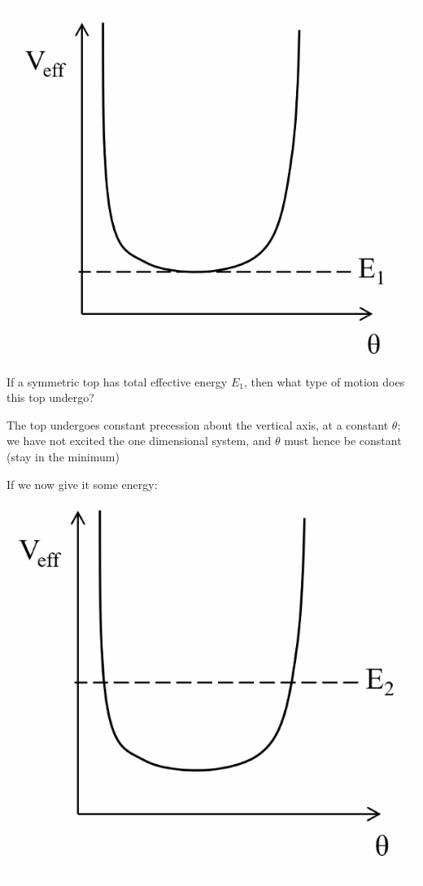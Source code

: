 \begin{center}
    \includegraphics[scale=0.5]{Lecture-22/l22-img2.png}
\end{center}
If a symmetric top has total effective energy $E_1$, then what type of motion does this top undergo?
\begin{s}
The top undergoes constant precession about the vertical axis, at a constant $\theta$; we have not excited the one dimensional system, and $\theta$ must hence be constant (stay in the minimum)
\end{s}
If we now give it some energy:
\begin{center}
    \includegraphics[scale=0.5]{Lecture-22/l22-img3.png}
\end{center}
